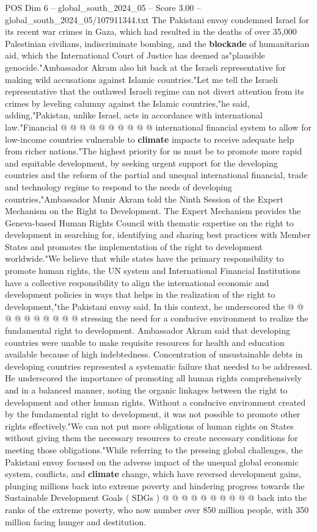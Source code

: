 \begin{textsample}{POS Dim 6 – global\_south\_2024\_05 – Score 3.00 – global\_south\_2024\_05/107911344.txt}
The Pakistani envoy condemned Israel for its recent war crimes in Gaza, which had resulted in the deaths of over 35,000 Palestinian civilians, indiscriminate bombing, and the \textbf{blockade} of humanitarian aid, which the International Court of Justice has deemed as"plausible genocide."Ambassador Akram also hit back at the Israeli representative for making wild accusations against Islamic countries."Let me tell the Israeli representative that the outlawed Israeli regime can not divert attention from its crimes by leveling calumny against the Islamic countries,"he said, adding,"Pakistan, unlike Israel, acts in accordance with international law."Financial @ @ @ @ @ @ @ @ @ @ international financial system to allow for low-income countries vulnerable to \textbf{climate} impacts to receive adequate help from richer nations."The highest priority for us must be to promote more rapid and equitable development, by seeking urgent support for the developing countries and the reform of the partial and unequal international financial, trade and technology regime to respond to the needs of developing countries,"Ambassador Munir Akram told the Ninth Session of the Expert Mechanism on the Right to Development.
The Expert Mechanism provides the Geneva-based Human Rights Council with thematic expertise on the right to development in searching for, identifying and sharing best practices with Member States and promotes the implementation of the right to development worldwide."We believe that while states have the primary responsibility to promote human rights, the UN system and International Financial Institutions have a collective responsibility to align the international economic and development policies in ways that helps in the realization of the right to development,"the Pakistani envoy said.
In this context, he underscored the @ @ @ @ @ @ @ @ @ @ stressing the need for a conducive environment to realize the fundamental right to development.
Ambassador Akram said that developing countries were unable to make requisite resources for health and education available because of high indebtedness.
Concentration of unsustainable debts in developing countries represented a systematic failure that needed to be addressed.
He underscored the importance of promoting all human rights comprehensively and in a balanced manner, noting the organic linkages between the right to development and other human rights.
Without a conducive environment created by the fundamental right to development, it was not possible to promote other rights effectively."We can not put more obligations of human rights on States without giving them the necessary resources to create necessary conditions for meeting those obligations."While referring to the pressing global challenges, the Pakistani envoy focused on the adverse impact of the unequal global economic system, conflicts, and \textbf{climate} change, which have reversed development gains, plunging millions back into extreme poverty and hindering progress towards the Sustainable Development Goals ( SDGs ) @ @ @ @ @ @ @ @ @ @ back into the ranks of the extreme poverty, who now number over 850 million people, with 350 million facing hunger and destitution.

\end{textsample}
